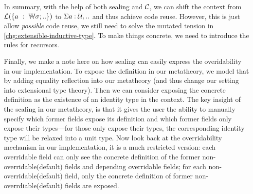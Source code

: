 


In summary, with the help of both sealing and ${\mathcal{C}}$, we can shift the context from ${\mathcal{L}}(\{a~:~{\mathbb{W}} \sigma; ..\})$ to $\Sigma a : {\mathcal{U}},..$ and thus achieve code reuse. However, this is just allow \textit{possible} {code reuse}, we still need to solve the mutated tension in \ref{chg:extensible-inductive-type}. To make things concrete, we need to introduce the rules for recursors.

Finally, we make a note here on how sealing can easily express the overidability in our implementation. To expose the definition in our metatheory, we model that by adding equality reflection into our metatheory (and thus change our setting into extensional type theory). Then we can consider exposing the concrete definition as the existence of an identity type in the context. The key insight of the sealing in our metatheory, is that it gives the user the ability to manually specify which former fields expose its definition and which  former fields only expose their types---for those only expose their types, the corresponding identity type will be relaxed into a unit type. Now look back at the overridability mechanism in our implementation, it is a much restricted version: each overridable field can only see the concrete definition of the former non-overridable(default) fields and depending overridable fields; for each non-overridable(default) field, only the concrete definition of former non-overrdiable(default) fields are exposed.


